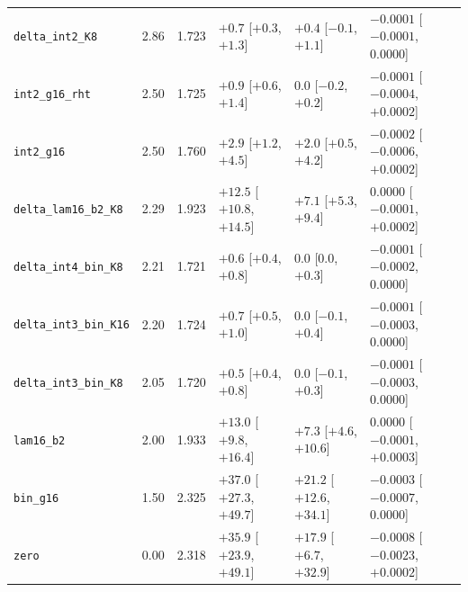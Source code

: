 \begin{table}[t]
\begin{tabular}{lrrlll}
\texttt{delta\_int2\_K8} & 2.86 & 1.723 & $+0.7$ [$+0.3$, $+1.3$] & $+0.4$ [$-0.1$, $+1.1$] & $-0.0001$ [$-0.0001$, 0.0000] \\
\texttt{int2\_g16\_rht} & 2.50 & 1.725 & $+0.9$ [$+0.6$, $+1.4$] & 0.0 [$-0.2$, $+0.2$] & $-0.0001$ [$-0.0004$, $+0.0002$] \\
\texttt{int2\_g16} & 2.50 & 1.760 & $+2.9$ [$+1.2$, $+4.5$] & $+2.0$ [$+0.5$, $+4.2$] & $-0.0002$ [$-0.0006$, $+0.0002$] \\
\texttt{delta\_lam16\_b2\_K8} & 2.29 & 1.923 & $+12.5$ [$+10.8$, $+14.5$] & $+7.1$ [$+5.3$, $+9.4$] & 0.0000 [$-0.0001$, $+0.0002$] \\
\texttt{delta\_int4\_bin\_K8} & 2.21 & 1.721 & $+0.6$ [$+0.4$, $+0.8$] & 0.0 [0.0, $+0.3$] & $-0.0001$ [$-0.0002$, 0.0000] \\
\texttt{delta\_int3\_bin\_K16} & 2.20 & 1.724 & $+0.7$ [$+0.5$, $+1.0$] & 0.0 [$-0.1$, $+0.4$] & $-0.0001$ [$-0.0003$, 0.0000] \\
\texttt{delta\_int3\_bin\_K8} & 2.05 & 1.720 & $+0.5$ [$+0.4$, $+0.8$] & 0.0 [$-0.1$, $+0.3$] & $-0.0001$ [$-0.0003$, 0.0000] \\
\texttt{lam16\_b2} & 2.00 & 1.933 & $+13.0$ [$+9.8$, $+16.4$] & $+7.3$ [$+4.6$, $+10.6$] & 0.0000 [$-0.0001$, $+0.0003$] \\
\texttt{bin\_g16} & 1.50 & 2.325 & $+37.0$ [$+27.3$, $+49.7$] & $+21.2$ [$+12.6$, $+34.1$] & $-0.0003$ [$-0.0007$, 0.0000] \\
\texttt{zero} & 0.00 & 2.318 & $+35.9$ [$+23.9$, $+49.1$] & $+17.9$ [$+6.7$, $+32.9$] & $-0.0008$ [$-0.0023$, $+0.0002$] \\
\bottomrule
\end{tabular}
\end{table}
